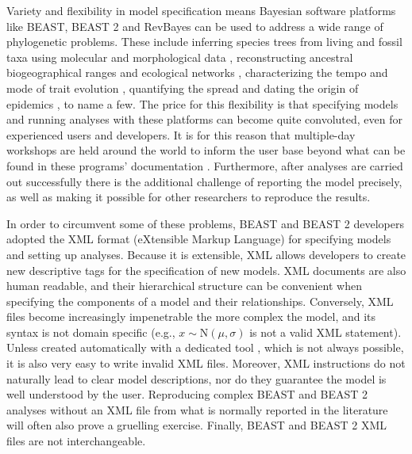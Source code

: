 \documentclass[10pt,letterpaper,table]{article}
\begin{document}
Variety and flexibility in model specification means Bayesian software
platforms like BEAST, BEAST 2 and RevBayes can be used to address a
wide range of phylogenetic problems. 
These include inferring species trees from living and fossil taxa
using molecular and morphological data
\cite{gavryushkina17,ogilvie21,zhang21}, reconstructing ancestral
biogeographical ranges \cite{lemey10,landis18} and ecological networks
\cite{braga20}, characterizing the tempo and mode of trait evolution
\cite{may19,bite}, quantifying the spread and dating the origin of
epidemics \cite{faria21,douglas21}, to name a few.
The price for this flexibility is that specifying models and running
analyses with these platforms can become quite convoluted,
even for experienced users and developers.
It is for this reason that multiple-day workshops are held around the
world to inform the user base beyond what can be found in these programs'
documentation \cite{taming,revworkshop}.
Furthermore, after analyses are carried out successfully there is the
additional challenge of reporting the model precisely, as well as
making it possible for other researchers to reproduce the results.

In order to circumvent some of these problems, BEAST \cite{beast} and
BEAST 2 \cite{beast2} developers adopted the XML format (eXtensible
Markup Language) for specifying models and setting up analyses.
Because it is extensible, XML allows developers to create new
descriptive tags for the specification of new models.
XML documents are also human readable, and their hierarchical
structure can be convenient when specifying the components of a model
and their relationships.
Conversely, XML files become increasingly impenetrable the more
complex the model, and its syntax is not domain specific (e.g., $x
\sim \text{N}(\mu, \sigma)$ is not a valid XML statement).
Unless created automatically with a dedicated tool \cite{beauti},
which is not always possible, it is also very easy to write 
invalid XML files.
Moreover, XML instructions do not naturally lead to clear model
descriptions, nor do they guarantee the model is well understood by
the user.
Reproducing complex BEAST and BEAST 2 analyses without an XML file
from what is normally reported in the literature will often also prove
a gruelling exercise.
Finally, BEAST and BEAST 2 XML files are not interchangeable. 
\end{document}
